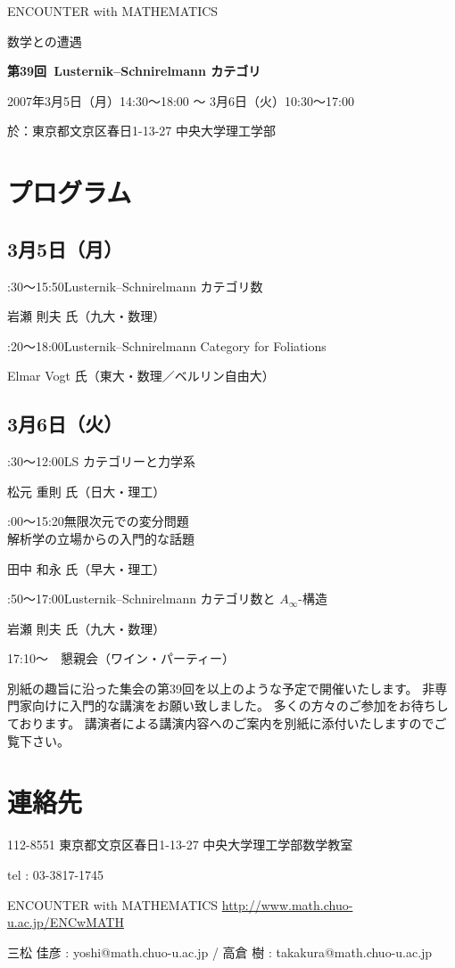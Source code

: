 \documentclass[uplatex,dvipdfmx]{jlreq}
\newcommand{\talk}[3]{%
\noindent
#1\quad #2\par
\hspace*{2em}#3\par\smallskip
}
\newcommand{\EwMnumber}{第39回}
\newcommand{\EwMtitle}{Lusternik–Schnirelmann カテゴリ}
\newcommand{\EwMdate}{2007年3月5日（月）14:30～18:00 ～ 3月6日（火）10:30～17:00}
\newcommand{\EwMplace}{東京都文京区春日1-13-27 中央大学理工学部}
\newcommand{\EwMtitleblock}{

\vspace*{-5mm}

\begin{center}

{\Large ENCOUNTER with MATHEMATICS}

\vspace{2mm}

{\large 数学との遭遇}

\vspace{4mm}

{\Large \bfseries \EwMnumber\ \EwMtitle}

\vspace{4mm}

\EwMdate

\vspace{2mm}

於：\EwMplace

\end{center}

\vspace{2mm}

}
\begin{document}
\EwMtitleblock


\section*{プログラム}

\subsection*{3月5日（月）}

\talk
{14:30～15:50}
{Lusternik–Schnirelmann カテゴリ数}
{岩瀬 則夫 氏（九大・数理）}

\talk
{16:20～18:00}
{Lusternik–Schnirelmann Category for Foliations}
{Elmar Vogt 氏（東大・数理／ベルリン自由大）}

\subsection*{3月6日（火）}

\talk
{10:30～12:00}
{LS カテゴリーと力学系}
{松元 重則 氏（日大・理工）}

\talk
{14:00～15:20}
{無限次元での変分問題\\[1mm]解析学の立場からの入門的な話題}
{田中 和永 氏（早大・理工）}

\talk
{15:50～17:00}
{Lusternik–Schnirelmann カテゴリ数と $A_\infty$-構造}
{岩瀬 則夫 氏（九大・数理）}

\bigskip

17:10～　懇親会（ワイン・パーティー）


\bigskip

別紙の趣旨に沿った集会の第39回を以上のような予定で開催いたします。  
非専門家向けに入門的な講演をお願い致しました。  
多くの方々のご参加をお待ちしております。  
講演者による講演内容へのご案内を別紙に添付いたしますのでご覧下さい。


\section*{連絡先}

112-8551 東京都文京区春日1-13-27 中央大学理工学部数学教室 

tel : 03-3817-1745  

ENCOUNTER with MATHEMATICS  
\url{http://www.math.chuo-u.ac.jp/ENCwMATH}  

三松 佳彦 : yoshi@math.chuo-u.ac.jp / 高倉 樹 : takakura@math.chuo-u.ac.jp
\end{document}
